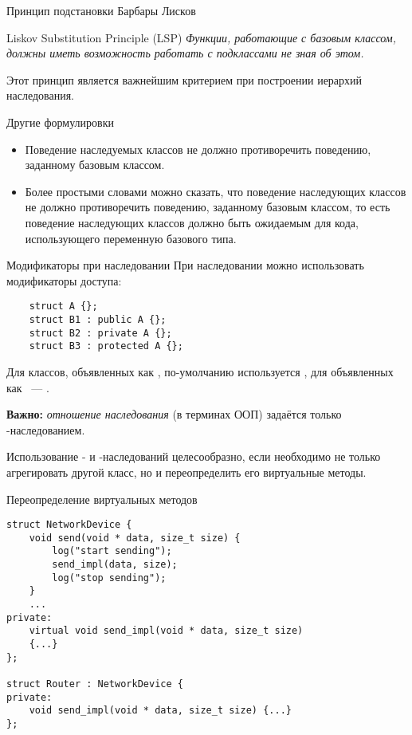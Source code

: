 \documentclass{beamer}
\begin{document}
\begin{frame}[fragile]{Принцип подстановки Барбары Лисков}
\begin{block}{Liskov Substitution Principle (LSP)} 
\em\centering  Функции, работающие с базовым классом, должны иметь 
    возможность работать с подклассами не зная об этом.
\end{block}    
Этот принцип является важнейшим критерием при построении иерархий наследования. 
\begin{block}{Другие формулировки}
\begin{itemize}
    \item Поведение наследуемых классов не должно противоречить поведению,
            заданному базовым классом.
    \item Более простыми словами можно сказать, что поведение наследующих классов не должно противоречить поведению, заданному базовым классом, 
        то есть поведение наследующих классов должно быть ожидаемым для кода, использующего переменную базового типа.
\end{itemize}
\end{block}
\end{frame}

\begin{frame}[fragile]{Модификаторы при наследовании}
    При наследовании можно использовать модификаторы доступа:
\begin{lstlisting}
    struct A {};
    struct B1 : public A {};
    struct B2 : private A {};
    struct B3 : protected A {};
\end{lstlisting}
Для классов, объявленных как , по-умолчанию используется
, для объявленных как ~— .
\vspace{3mm}

{\bf Важно:} {\em отношение наследования} (в терминах ООП) задаётся только -наследованием.
\vspace{3mm}

Использование - и -наследований целесообразно,
если необходимо не только агрегировать другой класс, но и переопределить его виртуальные методы.
\end{frame}

\begin{frame}[fragile]{Переопределение  виртуальных методов}
    \begin{lstlisting}[basicstyle=\fontsize{9pt}{1em}\ttfamily,commentstyle=\fontsize{9pt}{1em}\ttfamily\color{MOOCGreen}]
struct NetworkDevice {
    void send(void * data, size_t size) {
        log("start sending");
        send_impl(data, size);
        log("stop sending");
    }
    ...
private:
    virtual void send_impl(void * data, size_t size) 
    {...}
};

struct Router : NetworkDevice {
private:
    void send_impl(void * data, size_t size) {...}
};
    \end{lstlisting}
\end{frame}
\end{document}
